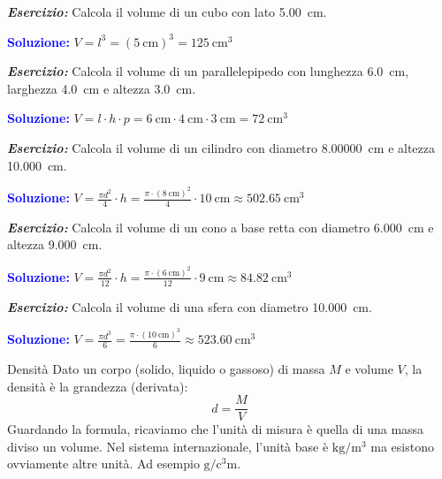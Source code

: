 \documentclass[12pt,a4paper,oneside]{book}
\makeatletter
\newcommand{\eserciziop}[1]{\noindent\textbf{\textit{Esercizio:}} #1}
\newcommand{\soluzione}[1]{\noindent\textcolor{blue}{\textbf{Soluzione:}} #1}
\renewcommand{\section}{\@startsection{section}{1}{\z@}
{-4ex \@plus -1ex \@minus -.4ex}
{1ex \@plus.2ex }
{\normalfont\large\sffamily\bfseries}}
\theoremstyle{esercizio}
\makeatother
\begin{document}
\eserciziop{Calcola il volume di un cubo con lato \SI{5,00}{\centi\metre}.}

\soluzione{
$V = l^3 = (\SI{5}{\centi\metre})^3 = \SI{125}{\centi\metre\cubed}$
}

\eserciziop{Calcola il volume di un parallelepipedo con lunghezza \SI{6,0}{\centi\metre}, larghezza \SI{4,0}{\centi\metre} e altezza \SI{3,0}{\centi\metre}.}

\soluzione{
$V = l \cdot h \cdot p = \SI{6}{\centi\metre} \cdot \SI{4}{\centi\metre} \cdot \SI{3}{\centi\metre} = \SI{72}{\centi\metre\cubed}$
}

\eserciziop{Calcola il volume di un cilindro con diametro \SI{8,00000}{\centi\metre} e altezza \SI{10,000}{\centi\metre}.}

\soluzione{
$V = \frac{\pi d^2}{4} \cdot h = \frac{\pi \cdot (\SI{8}{\centi\metre})^2}{4} \cdot \SI{10}{\centi\metre} \approx \SI{502,65}{\centi\metre\cubed}$
}

\eserciziop{Calcola il volume di un cono a base retta con diametro \SI{6,000}{\centi\metre} e altezza \SI{9,000}{\centi\metre}.}

\soluzione{
$V = \frac{\pi d^2}{12} \cdot h = \frac{\pi \cdot (\SI{6}{\centi\metre})^2}{12} \cdot \SI{9}{\centi\metre} \approx \SI{84,82}{\centi\metre\cubed}$
}

\eserciziop{Calcola il volume di una sfera con diametro \SI{10,000}{\centi\metre}.}

\soluzione{
$V = \frac{\pi d^3}{6} = \frac{\pi \cdot (\SI{10}{\centi\metre})^3}{6} \approx \SI{523,60}{\centi\metre\cubed}$
}


\section{Densità} Dato un corpo (solido, liquido o gassoso) di massa $M$ e volume $V$, la densità è la grandezza (derivata):
\[
d=\frac{M}{V}
\]
Guardando la formula, ricaviamo che l'unità di misura è quella di una massa diviso un volume. Nel sistema internazionale, l'unità base è $\si{\kilo\gram\per\cubic\meter}$ ma esistono ovviamente altre unità. Ad esempio $\si{\gram\per\cubic\centi\meter}$.
\end{document}
